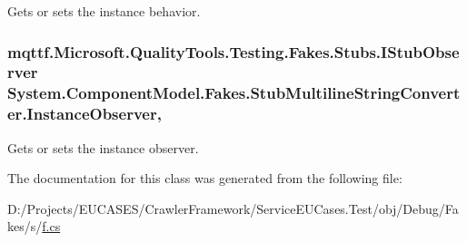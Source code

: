 Gets or sets the instance behavior.

\hypertarget{class_system_1_1_component_model_1_1_fakes_1_1_stub_multiline_string_converter_ac5dac3d28482e70bb51b9eb904cc1ee4}{
\subsubsection[{Instance\-Observer}]{\setlength{\rightskip}{0pt plus 5cm}mqttf.\-Microsoft.\-Quality\-Tools.\-Testing.\-Fakes.\-Stubs.\-I\-Stub\-Observer System.\-Component\-Model.\-Fakes.\-Stub\-Multiline\-String\-Converter.\-Instance\-Observer\hspace{0.3cm}{\ttfamily [get]}, {\ttfamily [set]}}}\label{class_system_1_1_component_model_1_1_fakes_1_1_stub_multiline_string_converter_ac5dac3d28482e70bb51b9eb904cc1ee4}


Gets or sets the instance observer.



The documentation for this class was generated from the following file\-:\begin{DoxyCompactItemize}
\item 
D\-:/\-Projects/\-E\-U\-C\-A\-S\-E\-S/\-Crawler\-Framework/\-Service\-E\-U\-Cases.\-Test/obj/\-Debug/\-Fakes/s/\hyperlink{s_2f_8cs}{f.\-cs}\end{DoxyCompactItemize}

